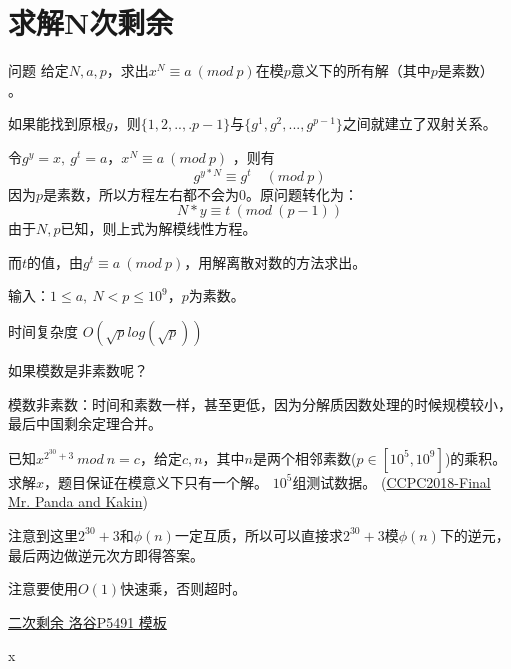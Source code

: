 \section{求解N次剩余}
\begin{custom}{问题}
	给定$N,a,p$，求出$x^N\equiv a\ (mod \ p)$在模$p$意义下的所有解（其中$p$是素数） 。
\end{custom}

\begin{solution}
	如果能找到原根$g$，则$\{1,2,..,.p-1\}$与$\{g^1,g^2,...,g^{p-1}\}$之间就建立了双射关系。
	
	令$g^y=x,\ g^t=a$，$x^N\equiv a\ (mod \ p)$ ，则有
	$$
	g^{y*N}\equiv g^t  \quad (mod \ p)
	$$
	因为$p$是素数，所以方程左右都不会为0。原问题转化为：
	$$
	N*y\equiv t\ (mod \ (p-1))
	$$
	由于$N,p$已知，则上式为解模线性方程。
	
	而$t$的值，由$g^t\equiv a \ (mod\ p)$，用解离散对数的方法求出。
\end{solution}

输入：$1 \le a,\ N < p \le 10^9$，$p$为素数。

{\heiti 时间复杂度}  $O(\sqrt{p}log(\sqrt{p}))$ 



{\heiti 如果模数是非素数呢？}

模数非素数：时间和素数一样，甚至更低，因为分解质因数处理的时候规模较小，最后中国剩余定理合并。


\begin{example}
	已知$x^{2^{30}+3}\ mod\ n = c$，给定$c,n$，其中$n$是两个相邻素数($p \in [10^5, 10^9]$)的乘积。求解$x$，题目保证在模意义下只有一个解。
	$10^5$组测试数据。
	(\href{https://codeforces.com/gym/102055/problem/K}{CCPC2018-Final Mr. Panda and Kakin})
\end{example}

\begin{solution}
	注意到这里$2^{30}+3$和$\phi(n)$一定互质，所以可以直接求$2^{30}+3$模$\phi(n)$下的逆元，最后两边做逆元次方即得答案。
	
	注意要使用$O(1)$快速乘，否则超时。
\end{solution}



\begin{problemset}
	\item \href{https://www.luogu.org/problem/P5491}{二次剩余 \quad 洛谷P5491 \quad 模板}
	\item x  
\end{problemset}